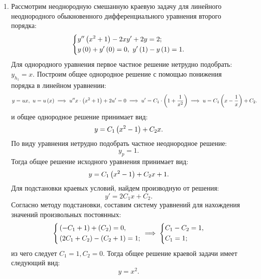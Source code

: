 \begin{enumerate}
			\item Рассмотрим неоднородную смешанную краевую задачу для линейного неоднородного обыкновенного дифференциального уравнения второго порядка:
				\[ \left\lbrace \begin{aligned} 
					&y'' \left( x^2 + 1 \right) - 2xy' + 2y = 2; \\
					&y \left( 0 \right) + y' \left( 0 \right) = 0, ~ y' \left( 1 \right) - y \left( 1 \right) = 1.
				 \end{aligned} \right. \]
				Для однородного уравнения первое частное решение нетрудно подобрать: $y_{h_1} = x$. Построим общее однородное решение с помощью понижения порядка в линейном уравнении:
				\[ y = ux, ~ u = u \left( x \right) \implies u'' x \cdot \left( x^2 + 1 \right) + 2u' = 0 \implies u' = C_1 \cdot \left( 1 + \frac{1}{x^2} \right) \implies u = C_1 \left( x - \frac{1}{x} \right) + C_2. \]
				и общее однородное решение принимает вид:
				\[ y = C_1 \left( x^2 - 1 \right) + C_2 x. \]
				По виду уравнения нетрудно подобрать частное неоднородное решение:
				\[ y_{p} = 1. \]
				Тогда общее решение исходного уравнения принимает вид:
				\[ y = C_1 \left( x^2 - 1 \right) + C_2 x + 1. \]
				Для подстановки краевых условий, найдем производную от решения:
				\[ y' = 2 C_1 x + C_2. \]
				Согласно методу подстановки, составим систему уравнений для нахождения значений произвольных постоянных:
				\[ \left\lbrace \begin{aligned} 
					& \left( - C_1 + 1 \right) + \left( C_2 \right) = 0, \\
					& \left( 2C_1 + C_2 \right) - \left( C_2 + 1 \right) = 1;  
				 \end{aligned} \right. \implies \left\lbrace \begin{aligned} 
					& C_1 - C_2 = 1, \\ &C_1 = 1;
				 \end{aligned} \right. \]
				из чего следует $C_1 = 1, C_2 = 0$. Тогда общее решение краевой задачи имеет следующий вид:
				\[ y = x^2. \]
				
		\end{enumerate}

